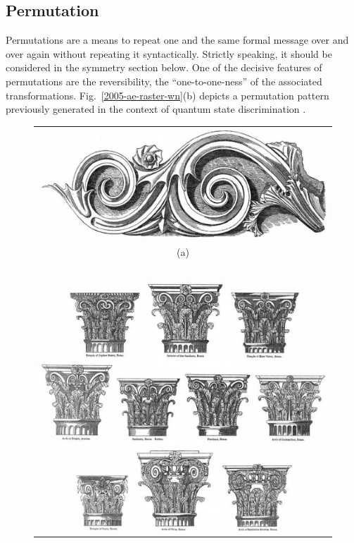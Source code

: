 \documentclass[rmp,amssymb,showpacs,showkeys,12pt,preprint]{revtex4}
\begin{document}
\subsection{Permutation}

Permutations are a means to repeat one and the same formal message over and
over again without repeating it syntactically. Strictly speaking, it should
be considered in the symmetry section below. One of the decisive features of
permutations are the reversibility, the ``one-to-one-ness'' of the
associated transformations.
Fig.~\ref{2005-ae-raster-wn}(b) depicts a permutation pattern previously generated
in the context of quantum state discrimination
\cite{DonSvo01,svozil-2002-statepart-prl,svozil-2004-kyoto,svozil-2003-garda}.

\begin{figure}[hptb]
\begin{center}
\begin{tabular}{c}
 \includegraphics[width=12cm]{2008-ae-greekornament1}\\
(a)\\
$\;$\\
 \includegraphics[width=13cm]{2008-ae-romanornament1}\\

\end{tabular}
\end{center}
\end{figure}
\end{document}

